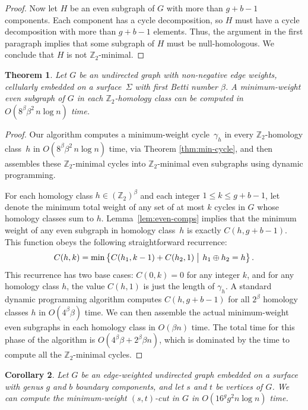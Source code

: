 \documentclass[11pt,twoside]{article}
\def\Z{\mathbb{Z}}
\newtheorem{theorem}{Theorem}[section]
\newtheorem{corollary}[theorem]{Corollary}
\begin{document}
{\begin{proof}
Now let $H$ be an even subgraph of $G$ with more than $g+b-1$ components.  Each component has a cycle decomposition, so $H$ must have a cycle decomposition with more than $g+b-1$ elements.  Thus, the argument in the first paragraph implies that some subgraph of $H$ must be null-homologous.  We conclude that $H$ is not $\Z_2$-minimal.
\end{proof}

\begin{theorem}
\label{thm:min-even}
Let $G$ be an undirected graph with non-negative edge weights, cellularly embedded on a surface~$\Sigma$ with first Betti number $\beta$.  A minimum-weight even subgraph of $G$ in each $\Z_2$-homology class can be computed in $O(8^\beta \beta^2\, n\log n)$ time.
\end{theorem}

\begin{proof}
Our algorithm computes a minimum-weight cycle~$\gamma_h$ in every $\Z_2$-homology class~$h$ in $O(8^\beta \beta^2\, n\log n)$ time, via Theorem \ref{thm:min-cycle}, and then assembles these $\Z_2$-minimal cycles into $\Z_2$-minimal even subgraphs using dynamic programming.

For each homology class $h\in (\Z_2)^\beta$ and each integer $1\le k\le g+b-1$, let  denote the minimum total weight of any set of at most $k$ cycles in $G$ whose homology classes sum to $h$.  Lemma~\ref{lem:even-comps} implies that the minimum weight of any even subgraph in homology class~$h$ is exactly $C(h, g+b-1)$.  This function obeys the following straightforward recurrence:
\[
	C(h,k) = \min\Setbar{C(h_1,k-1) + C(h_2, 1)\strut}{h_1\oplus h_2 = h}.
\]
This recurrence has two base cases: $C(0, k) = 0$ for any integer $k$, and for any homology class $h$, the value $C(h,1)$ is just the length of $\gamma_h$.  A standard dynamic programming algorithm computes $C(h, g+b-1)$ for all $2^\beta$ homology classes $h$ in $O(4^\beta \beta)$ time.  We can then assemble the actual minimum-weight even subgraphs in each homology class in $O(\beta n)$ time.  The total time for this phase of the algorithm is $O(4^\beta \beta + 2^\beta \beta n)$, which is dominated by the time to compute all the $\Z_2$-minimal cycles.
\end{proof}

\begin{corollary}
\label{cor:mincut}
Let $G$ be an edge-weighted undirected graph embedded on a surface with genus $g$ and $b$ boundary components, and let $s$ and $t$ be vertices of $G$.  We can compute the minimum-weight $(s,t)$-cut in $G$ in $O(16^g g^2 n \log n)$ time.
\end{corollary}

}
\end{document}
